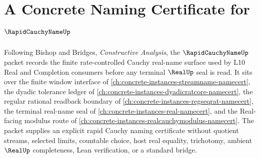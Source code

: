 \chapter{A Concrete Naming Certificate for $\RapidCauchyNameUp$}
\label{ch:concrete-instances-rapid-cauchy-name-namecert}

Following Bishop and Bridges, \emph{Constructive Analysis}, the $\RapidCauchyNameUp$ packet records the finite rate-controlled Cauchy real-name surface used by L10 Real and Completion consumers before any terminal $\RealUp$ seal is read. It sits over the finite window interface of \autoref{ch:concrete-instances-streamname-namecert}, the dyadic tolerance ledger of \autoref{ch:concrete-instances-dyadicratcore-namecert}, the regular rational readback boundary of \autoref{ch:concrete-instances-regseqrat-namecert}, the terminal real-name seal of \autoref{ch:concrete-instances-real-namecert}, and the Real-facing modulus route of \autoref{ch:concrete-instances-realcauchymodulus-namecert}. The packet supplies an explicit rapid Cauchy naming certificate without quotient streams, selected limits, countable choice, host real equality, trichotomy, ambient $\RealUp$ completeness, Lean verification, or a standard bridge.

